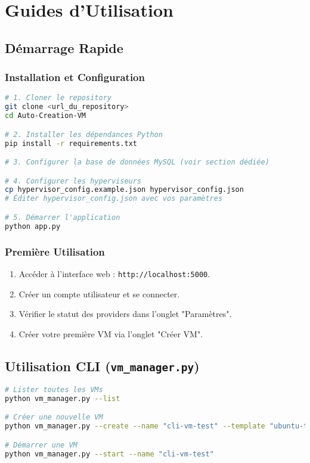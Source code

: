 \documentclass[11pt,a4paper]{article}
\newcommand{\bluecode}[1]{\textcolor{codeblue}{\texttt{#1}}}
\begin{document}
\section{Guides d'Utilisation}

\subsection{Démarrage Rapide}

\subsubsection{Installation et Configuration}
\begin{lstlisting}[language=bash]
# 1. Cloner le repository
git clone <url_du_repository>
cd Auto-Creation-VM

# 2. Installer les dépendances Python
pip install -r requirements.txt

# 3. Configurer la base de données MySQL (voir section dédiée)

# 4. Configurer les hyperviseurs
cp hypervisor_config.example.json hypervisor_config.json
# Éditer hypervisor_config.json avec vos paramètres

# 5. Démarrer l'application
python app.py
\end{lstlisting}

\subsubsection{Première Utilisation}
\begin{enumerate}
  \item Accéder à l'interface web : \bluecode{http://localhost:5000}.
  \item Créer un compte utilisateur et se connecter.
  \item Vérifier le statut des providers dans l'onglet "Paramètres".
  \item Créer votre première VM via l'onglet "Créer VM".
\end{enumerate}

\subsection{Utilisation CLI (\texttt{vm\_manager.py})}
\begin{lstlisting}[language=bash]
# Lister toutes les VMs
python vm_manager.py --list

# Créer une nouvelle VM
python vm_manager.py --create --name "cli-vm-test" --template "ubuntu-template"

# Démarrer une VM
python vm_manager.py --start --name "cli-vm-test"
\end{lstlisting}
\end{document}
